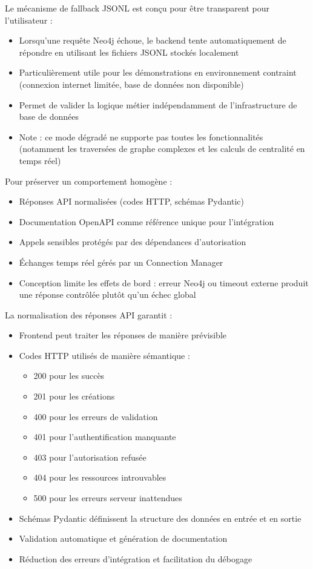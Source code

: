 \documentclass[12pt,a4paper]{report}
\begin{document}
Le mécanisme de fallback JSONL est conçu pour être transparent pour l'utilisateur :
\begin{itemize}
  \item Lorsqu'une requête Neo4j échoue, le backend tente automatiquement de répondre en utilisant les fichiers JSONL stockés localement
  \item Particulièrement utile pour les démonstrations en environnement contraint (connexion internet limitée, base de données non disponible)
  \item Permet de valider la logique métier indépendamment de l'infrastructure de base de données
  \item Note : ce mode dégradé ne supporte pas toutes les fonctionnalités (notamment les traversées de graphe complexes et les calculs de centralité en temps réel)
\end{itemize}

Pour préserver un comportement homogène :
\begin{itemize}
  \item Réponses API normalisées (codes HTTP, schémas Pydantic)
  \item Documentation OpenAPI comme référence unique pour l'intégration
  \item Appels sensibles protégés par des dépendances d'autorisation
  \item Échanges temps réel gérés par un Connection Manager
  \item Conception limite les effets de bord : erreur Neo4j ou timeout externe produit une réponse contrôlée plutôt qu'un échec global
\end{itemize}

La normalisation des réponses API garantit :
\begin{itemize}
  \item Frontend peut traiter les réponses de manière prévisible
  \item Codes HTTP utilisés de manière sémantique :
    \begin{itemize}
      \item 200 pour les succès
      \item 201 pour les créations
      \item 400 pour les erreurs de validation
      \item 401 pour l'authentification manquante
      \item 403 pour l'autorisation refusée
      \item 404 pour les ressources introuvables
      \item 500 pour les erreurs serveur inattendues
    \end{itemize}
  \item Schémas Pydantic définissent la structure des données en entrée et en sortie
  \item Validation automatique et génération de documentation
  \item Réduction des erreurs d'intégration et facilitation du débogage
\end{itemize}
\end{document}
